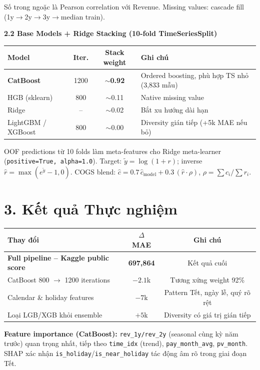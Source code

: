 \documentclass{article}
\begin{document}
\noindent Số trong ngoặc là Pearson correlation với Revenue. Missing values: cascade fill (1y$\to$2y$\to$3y$\to$median train).

\vspace{0.4em}
\noindent\textbf{2.2 Base Models + Ridge Stacking (10-fold TimeSeriesSplit)}

\begin{table}[H]
\vspace{-0.3em}
\centering\small
\setlength{\tabcolsep}{5pt}
\begin{tabular}{lccl}
\toprule
\textbf{Model} & \textbf{Iter.} & \textbf{Stack weight} & \textbf{Ghi chú} \\
\midrule
\textbf{CatBoost} & 1200 & $\sim$\textbf{0.92} & Ordered boosting, phù hợp TS nhỏ (3,833 mẫu) \\
HGB (sklearn)     & 800  & $\sim$0.11          & Native missing value \\
Ridge             & --   & $\sim$0.02          & Bắt xu hướng dài hạn \\
LightGBM / XGBoost & 800 & $\sim$0.00          & Diversity gián tiếp (+5k MAE nếu bỏ) \\
\bottomrule
\end{tabular}
\vspace{-0.3em}
\end{table}

\noindent OOF predictions từ 10 folds làm meta-features cho Ridge meta-learner (\texttt{positive=True, alpha=1.0}). Target: $\tilde{y}=\log(1+r)$; inverse $\hat{r}=\max(e^{\tilde{y}}-1, 0)$. COGS blend: $\hat{c}=0.7\,\hat{c}_{\text{model}}+0.3\,(\hat{r}\cdot\rho)$, $\rho=\sum c_i/\sum r_i$.

\section*{3.\; Kết quả Thực nghiệm}

\begin{table}[H]
\vspace{-0.3em}
\centering\small
\setlength{\tabcolsep}{5pt}
\begin{tabular}{lcc}
\toprule
\textbf{Thay đổi} & \textbf{$\Delta$ MAE} & \textbf{Ghi chú} \\
\midrule
\textbf{Full pipeline -- Kaggle public score} & \textbf{697,864} & Kết quả cuối \\
CatBoost 800 $\to$ 1200 iterations & $-2.1$k & Tương xứng weight 92\% \\
Calendar \& holiday features & $-7$k & Pattern Tết, ngày lễ, quý rõ rệt \\
Loại LGB/XGB khỏi ensemble & $+5$k & Diversity có giá trị gián tiếp \\
\bottomrule
\end{tabular}
\vspace{-0.3em}
\end{table}

\noindent\textbf{Feature importance (CatBoost):} \texttt{rev\_1y/rev\_2y} (seasonal cùng kỳ năm trước) quan trọng nhất, tiếp theo \texttt{time\_idx} (trend), \texttt{pay\_month\_avg}, \texttt{pv\_month}. SHAP xác nhận \texttt{is\_holiday}/\texttt{is\_near\_holiday} tác động âm rõ trong giai đoạn Tết.
\end{document}
